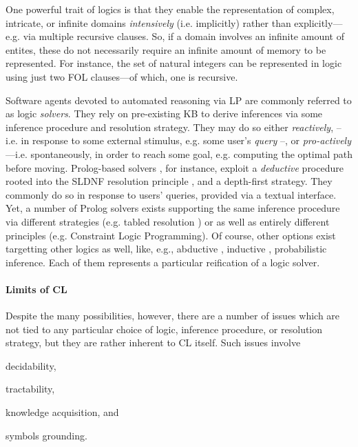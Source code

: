 \documentclass[12pt,a4paper,openright,twoside]{book}
\begin{document}
One powerful trait of logics is that they enable the representation of complex, intricate, or infinite domains \emph{intensively} (i.e. implicitly) rather than explicitly---e.g. via multiple recursive clauses.
%
So, if a domain involves an infinite amount of entites, these do not necessarily require an infinite amount of memory to be represented.
%
For instance, the set of natural integers can be represented in logic using just two FOL clauses---of which, one is recursive.

Software agents devoted to automated reasoning via LP are commonly referred to as logic \emph{solvers}.
%
They rely on pre-existing KB to derive inferences via some inference procedure and resolution strategy.
%
They may do so either \emph{reactively}, -- i.e. in response to some external stimulus, e.g. some user's \emph{query} --, or \emph{pro-actively}---i.e. spontaneously, in order to reach some goal, e.g. computing the optimal path before moving.
%
Prolog-based solvers \cite{ColmerauerR93,colmerauer1986-theoreticalProlog}, for instance, exploit a \emph{deductive} procedure rooted into the SLDNF resolution principle \cite{Kowalski1974, Clark77}, and a depth-first strategy.
%
They commonly do so in response to users' queries, provided via a textual interface.
%
Yet, a number of Prolog solvers exists supporting the same inference procedure via different strategies (e.g. tabled resolution \cite{ChenW96,SwiftW12}) or as well as entirely different principles (e.g. Constraint Logic Programming).
%
Of course, other options exist targetting other logics as well, like, e.g., abductive \cite{FungIff97}, inductive \cite{Muggleton94}, probabilistic \cite{RaedtK15} inference.
%
Each of them represents a particular reification of a logic solver.

\paragraph{Limits of CL}

Despite the many possibilities, however, there are a number of issues which are not tied to any particular choice of logic, inference procedure, or resolution strategy, but they are rather inherent to CL itself.
%
Such issues involve
%
\begin{inlinelist}
    \item decidability,
    \item tractability,
    \item knowledge acquisition, and
    \item symbols grounding.
\end{inlinelist}
\end{document}

